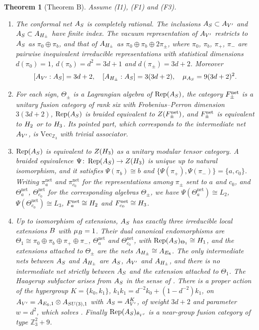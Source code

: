 \documentclass[leqno]{article}
\let\cal\relax
\newcommand{\cal}{\mathcal}
\newcommand{\Z}{\ensuremath{\mathbb{Z}}}
\newcommand{\co}{\colon}
\newcommand{\ot}{\otimes}
\DeclareMathOperator{\Rep}{Rep}
\newtheorem{thm}{Theorem}[section]
\numberwithin{equation}{section}
\begin{document}
\begin{thm}[Theorem B]
\label{thm:net}
Assume \textup{(I1)}, \textup{(F1)} and \textup{(F3)}.
\begin{enumerate}
\item The conformal net $\cal A_S$ is completely rational. The inclusions $\cal A_S \subset \cal A_{V'}$ and $\cal A_S \subset \cal A_{H_\pm}$ have finite index. The vacuum representation of $\cal A_{V'}$ restricts to $\cal A_S$ as $\pi_0 \oplus \pi_b$, and that of $\cal A_{H_\pm}$ as $\pi_0 \oplus \pi_b \oplus 2\pi_\pm$, where $\pi_0$, $\pi_b$, $\pi_+$, $\pi_-$ are pairwise inequivalent irreducible representations with statistical dimensions $d(\pi_0) = 1$, $d(\pi_b) = d^2 = 3d+1$ and $d(\pi_\pm) = 3d+2$. Moreover
\[
[\cal A_{V'} : \cal A_S] = 3d+2,
\quad
[\cal A_{H_\pm} : \cal A_S] = 3(3d+2),
\quad
\mu_{\cal A_S} = 9(3d+2)^2.
\]
\item For each sign, $\Theta_\pm$ is a Lagrangian algebra of $\Rep(\cal A_S)$, the category $\cal F^{\mathrm{net}}_\pm$ is a unitary fusion category of rank six with Frobenius--Perron dimension $3(3d+2)$, $\Rep(\cal A_S)$ is braided equivalent to $Z(\cal F^{\mathrm{net}}_\pm)$, and $\cal F^{\mathrm{net}}_\pm$ is equivalent to $\cal H_2$ or to $\cal H_3$. Its pointed part, which corresponds to the intermediate net $\cal A_{V'}$, is $\mathrm{Vec}_{\Z_3}$ with trivial associator.
\item $\Rep(\cal A_S)$ is equivalent to $Z(\cal H_3)$ as a unitary modular tensor category. A braided equivalence $\Psi \co \Rep(\cal A_S) \to Z(\cal H_3)$ is unique up to natural isomorphism, and it satisfies $\Psi(\pi_b) \cong b$ and $\{\Psi(\pi_+),\Psi(\pi_-)\} = \{a,c_0\}$. Writing $\pi^{\mathrm{net}}_a$ and $\pi^{\mathrm{net}}_{c_0}$ for the representations among $\pi_\pm$ sent to $a$ and $c_0$, and $\Theta^{\mathrm{net}}_a$, $\Theta^{\mathrm{net}}_{c_0}$ for the corresponding algebras $\Theta_\pm$, we have $\Psi(\Theta^{\mathrm{net}}_a) \cong L_2$, $\Psi(\Theta^{\mathrm{net}}_{c_0}) \cong L_3$, $\cal F^{\mathrm{net}}_a \cong \cal H_2$ and $\cal F^{\mathrm{net}}_{c_0} \cong \cal H_3$.
\item Up to isomorphism of extensions, $\cal A_S$ has exactly three irreducible local extensions $\cal B$ with $\mu_{\cal B} = 1$. Their dual canonical endomorphisms are $\Theta_1 \cong \pi_0 \oplus \pi_b \oplus \pi_+ \oplus \pi_-$, $\Theta^{\mathrm{net}}_a$ and $\Theta^{\mathrm{net}}_{c_0}$, with $\Rep(\cal A_S)_{\Theta_1} \cong \cal H_1$, and the extensions attached to $\Theta_\pm$ are the nets $\cal A_{H_\pm} \cong \cal A_{E_8}$. The only intermediate nets between $\cal A_S$ and $\cal A_{H_\pm}$ are $\cal A_S$, $\cal A_{V'}$ and $\cal A_{H_\pm}$, and there is no intermediate net strictly between $\cal A_S$ and the extension attached to $\Theta_1$. The Haagerup subfactor arises from $\cal A_S$ in the sense of \cite[Definition 4.1]{Bis17a}. There is a proper action of the hypergroup $K = \{k_0,k_1\}$, $k_1k_1 = d^{-2}k_0+(1-d^{-2})k_1$, on $\cal A_{V'} = \cal A_{E_6,1} \ot \cal A_{SU(3),1}$ with $\cal A_S = \cal A_{V'}^K$, of weight $3d+2$ and parameter $w = d^2$, which solves \cite[Problem 4.27]{Bis17b}. Finally $\Rep(\cal A_S)_{\theta_{V'}}$ is a near-group fusion category of type $\Z_3^2+9$.

\end{enumerate}
\end{thm}
\end{document}
